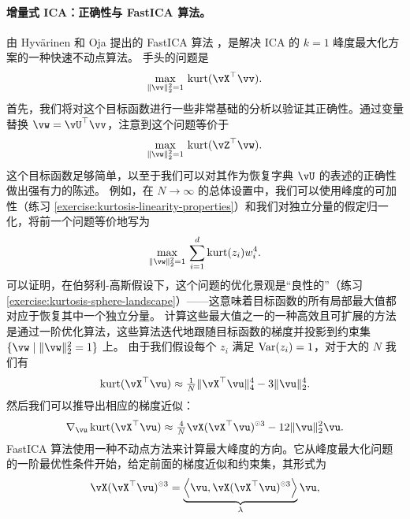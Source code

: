 \documentclass[../../book-main_zh.tex]{subfiles}
\begin{document}
\paragraph{增量式 ICA：正确性与 FastICA 算法。}
由 Hyvärinen 和 Oja 提出的 FastICA 算法 \cite{hyvarinen-1997}，是解决 ICA 的 $k=1$ 峰度最大化方案的一种快速不动点算法。
手头的问题是
\begin{equation}\label{eq:kurtosis-maximization-sphere-finitesample}
    \max_{\norm{\vv}_2^2 = 1}\, \kurt(\vX^\top \vv).
\end{equation}
首先，我们将对这个目标函数进行一些非常基础的分析以验证其正确性。通过变量替换 $\vw = \vU^\top \vv$，注意到这个问题等价于
\begin{equation*}
    \max_{\norm{\vw}_2^2 = 1}\, 
    \mathrm{kurt}(\vZ^\top \vw).
\end{equation*}
这个目标函数足够简单，以至于我们可以对其作为恢复字典 $\vU$ 的表述的正确性做出强有力的陈述。
例如，在 $N \to \infty$ 的总体设置中，我们可以使用峰度的可加性（练习 \ref{exercise:kurtosis-linearity-properties}）和我们对独立分量的假定归一化，将前一个问题等价地写为
\begin{equation}\label{eq:kurtosis-maximization-sphere-population-simple}
    \max_{\norm{\vw}_2^2 = 1}\, 
    \sum_{i=1}^d \mathrm{kurt}(z_i) w_i^4.
\end{equation}
可以证明，在伯努利-高斯假设下，这个问题的优化景观是“良性的”（练习 \ref{exercise:kurtosis-sphere-landscape}）——这意味着目标函数的所有局部最大值都对应于恢复其中一个独立分量。
计算这些最大值之一的一种高效且可扩展的方法是通过一阶优化算法，这些算法迭代地跟随目标函数的梯度并投影到约束集 $\set{\vw \given \norm{\vw}_2^2 = 1}$ 上。
由于我们假设每个 $z_i$ 满足 $\operatorname{Var}(z_i)=1$，对于大的 $N$ 我们有
\begin{equation}\label{eq:kurtosis-approximation-l4}
    \kurt(\vX^\top \vu)
    \approx
    \tfrac{1}{N} \norm{\vX^\top \vu}_4^4 - 3 \norm{\vu}_2^4.
\end{equation}
然后我们可以推导出相应的梯度近似：
\begin{equation*}
    \nabla_{\vu} \kurt(\vX^\top \vu)
    \approx
    \tfrac{4}{N} \vX (\vX^\top \vu)^{\hada 3}
    - 12 \norm{\vu}_2^2 \vu.
\end{equation*}
FastICA 算法使用一种不动点方法来计算最大峰度的方向。它从峰度最大化问题的一阶最优性条件开始，给定前面的梯度近似和约束集，其形式为
\begin{align}\label{eq:kurtosis-max-sphere-stationarity}
   \vX (\vX^\top \vu)^{\hada 3} 
   = 
   \underbrace{
   \ip*{\vu}{
   \vX (\vX^\top \vu)^{\hada 3} 
   }}_{\lambda} \vu,
\end{align}
\end{document}
